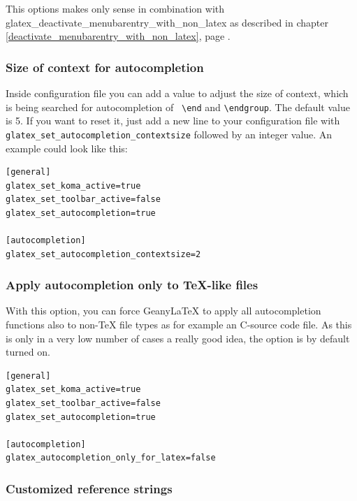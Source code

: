 \documentclass[%
paper=a4,%
fontsize=11pt,%
twoside=false,%
DIV18,%
headsepline,%
plainheadsepline,%
footsepline,%
plainfootsepline,%
bibliography=totoc,%
listof=totoc,%
BCOR10mm,%
parskip=half,%
openany,%
]{scrartcl}
\begin{document}
This options makes only sense in combination with
glatex\_deactivate\_menubarentry\_with\_non\_latex
as described in chapter \ref{deactivate_menubarentry_with_non_latex},
page \pageref {deactivate_menubarentry_with_non_latex}.

\subsubsection{Size of context for autocompletion}
\label{sec:hidden_pref_autocompletion_context}
Inside configuration file you can add a value to adjust the size of
context, which is being searched for autocompletion of \texttt{
\textbackslash{}end} and \texttt{\textbackslash{}endgroup}. The
default value is 5. If you want to reset it, just add a new line to
your configuration file with
\texttt{glatex\_set\_autocompletion\_contextsize} followed by an integer
value. An example could look like this:

\begin{lstlisting}[caption={Example configuration for contextsize of autocompletion}]
[general]
glatex_set_koma_active=true
glatex_set_toolbar_active=false
glatex_set_autocompletion=true

[autocompletion]
glatex_set_autocompletion_contextsize=2
\end{lstlisting}

\subsubsection{Apply autocompletion only to \TeX{}-like files}
With this option, you can force Geany\LaTeX{} to apply all autocompletion functions also to non-\TeX{} file types as for example an C-source code file. As this is only in a very low number of cases a really good idea, the option is by default turned on.

\begin{lstlisting}[caption={general.conf example for deactivating file %
						   type specific restrictions for autocompletion}]
[general]
glatex_set_koma_active=true
glatex_set_toolbar_active=false
glatex_set_autocompletion=true

[autocompletion]
glatex_autocompletion_only_for_latex=false
\end{lstlisting}

\subsubsection{Customized reference strings}
\end{document}
